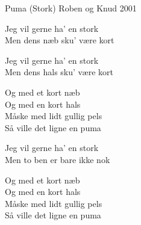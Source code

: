 \begin{song}{Puma (Stork)}{}
  {\SBOrgMel}
  {Roben og Knud}
  {2001}
  {\NotCCLIed}

  \begin{SBVerse}
    Jeg vil gerne ha' en stork\\
    Men dens næb sku' være kort\\
  \end{SBVerse}

  \begin{SBVerse}
    Jeg vil gerne ha' en stork\\
    Men dens hals sku' være kort\\
  \end{SBVerse}

  \begin{SBSection*}
    Og med et kort næb\\
    Og med en kort hals\\
    Måske med lidt gullig pels\\
    Så ville det ligne en puma
  \end{SBSection*}

  \begin{SBChorus}
  \end{SBChorus}

  \begin{SBVerse}
    Jeg vil gerne ha' en stork\\
    Men to ben er bare ikke nok\\
  \end{SBVerse}

  \begin{SBSection*}
    Og med et kort næb\\
    Og med en kort hals\\
    Måske med lidt gullig pels\\
    Så ville det ligne en puma
  \end{SBSection*}

  \begin{SBChorus}
  \end{SBChorus}


\end{song}
